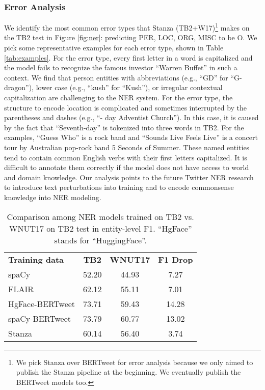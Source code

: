 \documentclass[10pt, a4paper]{article}
\begin{document}
\subsubsection{Error Analysis}
We identify the most common error types that Stanza (TB2+W17)\footnote{We pick Stanza over BERTweet for error analysis because we only aimed to publish the Stanza pipeline at the beginning. We eventually publish the BERTweet models too.} makes on the TB2 test in Figure \ref{fig:ner}: predicting PER, LOC, ORG, MISC to be O.  We pick some representative examples for each error type, shown in Table \ref{tab:examples}.  For the   error type, every first letter in a word is capitalized and the model fails to recognize the famous investor ``Warren Buffet'' in such a context. We find that person entities with abbreviations (e.g., ``GD'' for ``G-dragon''), lower case (e.g., ``kush'' for ``Kush''), or irregular contextual capitalization are challenging to the NER system. For the   error type, the  structure to encode location is complicated and sometimes interrupted by the parentheses and dashes (e.g., ``- day Adventist Church''). In this case, it is caused by the fact that ``Seventh-day'' is tokenized into three words in TB2.  For the  examples, ``Guess Who'' is a rock band and ``Sounds Live Feels Live'' is a concert tour by Australian pop-rock band 5 Seconds of Summer. These named entities tend to contain common English verbs with their first letters capitalized. It is difficult to annotate them correctly if the model does not have access to world and domain knowledge. Our analysis points to the future Twitter NER research to introduce text perturbations into training and to encode commonsense knowledge into NER modeling.





\begin{table}[h]
\centering
\begin{tabular}{l|cc|c}
\textbf{Training data} & \textbf{TB2} & \textbf{WNUT17} & \textbf{F1 Drop}\\ \Xhline{2\arrayrulewidth}
spaCy & 52.20 & 44.93 & 7.27\\
FLAIR &  62.12 & 55.11 &  7.01\\
\hdashline
HgFace-BERTweet & 73.71 & 59.43 & 14.28\\
spaCy-BERTweet &  73.79 & 60.77 & 13.02 \\
\hline
Stanza &  60.14 & 56.40  &  3.74\\
\end{tabular}
\caption{Comparison among NER models trained on TB2 vs. WNUT17 on TB2 test in entity-level F1. ``HgFace'' stands for ``HuggingFace''.}
\label{tab:NER_WNUT17}
\end{table}
\end{document}
